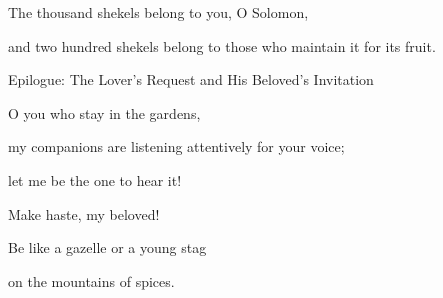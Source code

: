 {\par }{\Q The thousand
shekels belong to you, O Solomon,
\par }{\Q and two hundred
shekels belong to those who maintain
it for its fruit.
\par }{\SH Epilogue: The Lover’s Request and His Beloved’s Invitation
\par }{\SH 
{}
\par }{\Q {}O you who stay
in the gardens,
\par }{\Q my companions
are listening attentively
for your voice;
\par }{\Q let me be the one to hear it!
\par }{\SH 
{}
\par }{\Q {}Make haste,
my beloved!
\par }{\Q Be like
a gazelle
or
a young
stag
\par }{\PP on
the mountains
of spices.
\par }